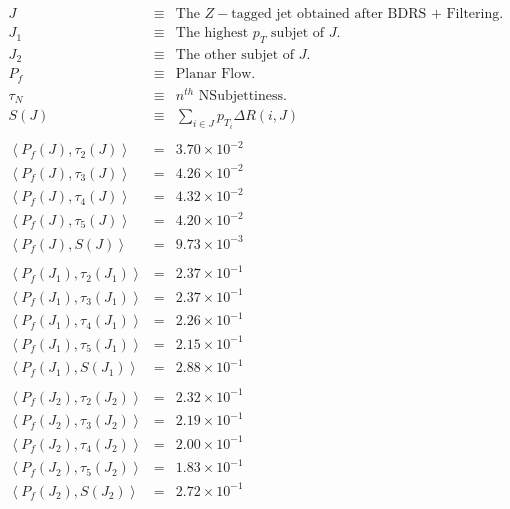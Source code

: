 \begin{eqnarray*}
    J & \equiv & \text{The }Z-\text{tagged jet obtained after BDRS + Filtering.}\\
    J_{1} & \equiv & \text{The highest }p_{T}\text{ subjet of }J.\\
    J_{2} & \equiv & \text{The other subjet of }J.\\
    P_{f} & \equiv & \text{Planar Flow}.\\
    \tau_{N} & \equiv & n^{th}\text{ NSubjettiness}.\\
    S\left(J\right) & \equiv & \sum_{i\in J}p_{T_{i}}\Delta R\left(i,J\right)\\
    \\
    \left\langle P_{f}\left(J\right),\tau_{2}\left(J\right)\right\rangle  & = & 3.70\times10^{-2}\\
    \left\langle P_{f}\left(J\right),\tau_{3}\left(J\right)\right\rangle  & = & 4.26\times10^{-2}\\
    \left\langle P_{f}\left(J\right),\tau_{4}\left(J\right)\right\rangle  & = & 4.32\times10^{-2}\\
    \left\langle P_{f}\left(J\right),\tau_{5}\left(J\right)\right\rangle  & = & 4.20\times10^{-2}\\
    \left\langle P_{f}\left(J\right),S\left(J\right)\right\rangle  & = & 9.73\times10^{-3}\\
    \\
    \left\langle P_{f}\left(J_{1}\right),\tau_{2}\left(J_{1}\right)\right\rangle  & = & 2.37\times10^{-1}\\
    \left\langle P_{f}\left(J_{1}\right),\tau_{3}\left(J_{1}\right)\right\rangle  & = & 2.37\times10^{-1}\\
    \left\langle P_{f}\left(J_{1}\right),\tau_{4}\left(J_{1}\right)\right\rangle  & = & 2.26\times10^{-1}\\
    \left\langle P_{f}\left(J_{1}\right),\tau_{5}\left(J_{1}\right)\right\rangle  & = & 2.15\times10^{-1}\\
    \left\langle P_{f}\left(J_{1}\right),S\left(J_{1}\right)\right\rangle  & = & 2.88\times10^{-1}\\
    \\
    \left\langle P_{f}\left(J_{2}\right),\tau_{2}\left(J_{2}\right)\right\rangle  & = & 2.32\times10^{-1}\\
    \left\langle P_{f}\left(J_{2}\right),\tau_{3}\left(J_{2}\right)\right\rangle  & = & 2.19\times10^{-1}\\
    \left\langle P_{f}\left(J_{2}\right),\tau_{4}\left(J_{2}\right)\right\rangle  & = & 2.00\times10^{-1}\\
    \left\langle P_{f}\left(J_{2}\right),\tau_{5}\left(J_{2}\right)\right\rangle  & = & 1.83\times10^{-1}\\
    \left\langle P_{f}\left(J_{2}\right),S\left(J_{2}\right)\right\rangle  & = & 2.72\times10^{-1}\\
\end{eqnarray*}

